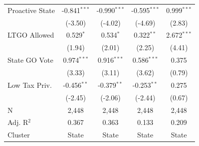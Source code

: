 \begin{tabular*}{\textwidth}{@{\extracolsep{\fill}}lcccc}
   Proactive State      & -0.841$^{***}$            & -0.990$^{***}$                & -0.595$^{***}$                       & 0.999$^{***}$\\   
                        & (-3.50)                  & (-4.02)                      & (-4.69)                             & (2.83)\\   
   LTGO Allowed         & 0.529$^{*}$               & 0.534$^{*}$                   & 0.322$^{**}$                         & 2.672$^{***}$\\   
                        & (1.94)                   & (2.01)                       & (2.25)                              & (4.41)\\   
   State GO Vote        & 0.974$^{***}$             & 0.916$^{***}$                 & 0.586$^{***}$                        & 0.375\\   
                        & (3.33)                   & (3.11)                       & (3.62)                              & (0.79)\\   
   Low Tax Priv.        & -0.456$^{**}$             & -0.379$^{**}$                 & -0.253$^{**}$                        & 0.275\\   
                        & (-2.45)                  & (-2.06)                      & (-2.44)                             & (0.67)\\   
   \hline
   N         & 2,448                     & 2,448                         & 2,448                                & 2,448\\  
   Adj. R$^2$       & 0.367                     & 0.363                         & 0.133                                & 0.209\\  
   Cluster              & State & State & State & State\\  
   \bottomrule
\end{tabular*}
\par\endgroup
